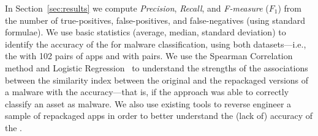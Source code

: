 In Section~\ref{sec:results} we compute \emph{Precision}, \emph{Recall}, and \emph{F-measure} ($F_1$) from
the number of true-positives, false-positives, and false-negatives (using standard
formulae). We use basic statistics (average, median, standard deviation) to identify the
accuracy of the \mas for malware classification, using both datasets---i.e., the \sds
with 102 pairs of apps and \cds with
\apps pairs. We use the Spearman Correlation~\cite{spearman-correlation} method and
Logistic Regression~\cite{statistical-learning} to understand the strengths of
the associations between the similarity index between the original and the repackaged versions
of a malware with the \mas accuracy---that is,
if the approach was able to correctly classify an asset as malware. We also use existing tools to reverse engineer a sample of repackaged
apps in order to better understand the (lack of) accuracy
of the \mas.







